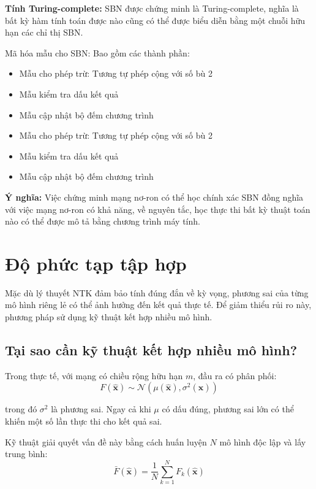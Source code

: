 \textbf{Tính Turing-complete:} SBN được chứng minh là Turing-complete, nghĩa là bất kỳ hàm tính toán được nào cũng có thể được biểu diễn bằng một chuỗi hữu hạn các chỉ thị SBN.

Mã hóa mẫu cho SBN: Bao gồm các thành phần:
\begin{itemize}
    \item Mẫu cho phép trừ: Tương tự phép cộng với số bù 2
    \item Mẫu kiểm tra dấu kết quả
    \item Mẫu cập nhật bộ đếm chương trình
    \item Mẫu cho phép trừ: Tương tự phép cộng với số bù 2
    \item Mẫu kiểm tra dấu kết quả
    \item Mẫu cập nhật bộ đếm chương trình
\end{itemize}

\textbf{Ý nghĩa:} Việc chứng minh mạng nơ-ron có thể học chính xác SBN đồng nghĩa với việc mạng nơ-ron có khả năng, về nguyên tắc, học thực thi bất kỳ thuật toán nào có thể được mô tả bằng chương trình máy tính.

\section{Độ phức tạp tập hợp}

Mặc dù lý thuyết NTK đảm bảo tính đúng đắn về kỳ vọng, phương sai của từng mô hình riêng lẻ có thể ảnh hưởng đến kết quả thực tế. Để giảm thiểu rủi ro này, phương pháp sử dụng kỹ thuật kết hợp nhiều mô hình.

\subsection{Tại sao cần kỹ thuật kết hợp nhiều mô hình?}

Trong thực tế, với mạng có chiều rộng hữu hạn $m$, đầu ra có phân phối:
\begin{equation}
    F(\hat{\mathbf{x}}) \sim \mathcal{N}(\mu(\hat{\mathbf{x}}), \sigma^2(\hat{\mathbf{x}}))
\end{equation}

trong đó $\sigma^2$ là phương sai. Ngay cả khi $\mu$ có dấu đúng, phương sai lớn có thể khiến một số lần thực thi cho kết quả sai.

\vspace{0.2cm}

Kỹ thuật giải quyết vấn đề này bằng cách huấn luyện $N$ mô hình độc lập và lấy trung bình:
\begin{equation}
    \bar{F}(\hat{\mathbf{x}}) = \frac{1}{N} \sum_{k=1}^{N} F_k(\hat{\mathbf{x}})
\end{equation}

